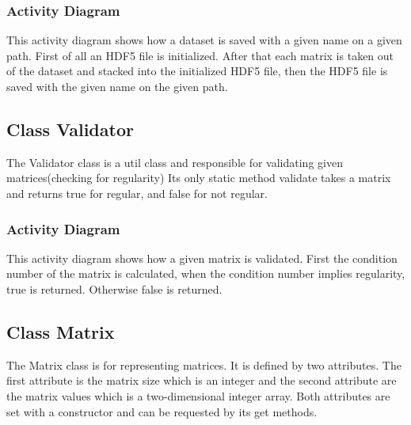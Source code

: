 \documentclass[parskip=full]{scrartcl}
\begin{document}
\subsubsection{Activity Diagram}
\newpage
\begin{figure}[h]
\begin{center}

\label{Activity Diagrams}
\end{center}
\end{figure}
\newpage
This activity diagram shows how a dataset is saved with a given name on a given path. First of all an \gls{HDF5} file is initialized.
After that each matrix is taken out of the dataset and stacked into the initialized \gls{HDF5} file, then the \gls{HDF5} file is saved with the given name on the given path.
\subsection{Class Validator}
The Validator class is a util class and responsible for validating given matrices(checking for regularity)
Its only static method validate takes a matrix and returns true for regular, and false for not regular.
\subsubsection{Activity Diagram}
\newpage
\begin{figure}[h]
\begin{center}

\label{Activity Diagrams}
\end{center}
\end{figure}
\newpage

This activity diagram shows how a given matrix is validated.
First the condition number of the matrix is calculated, when the condition number implies regularity, true is returned. Otherwise false is returned.

\subsection{Class Matrix}
The Matrix class is for representing matrices. It is defined by two attributes.
The first attribute is the matrix size which is an integer and the second attribute are the matrix values which is a two-dimensional integer array.
Both attributes are set with a constructor and can be requested by its get methods.
\end{document}
